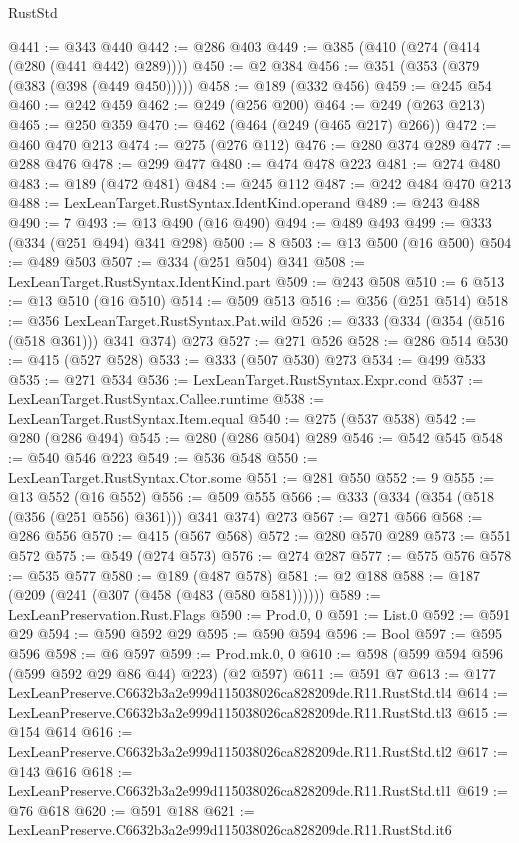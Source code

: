 \begin{lexlean}{RustStd}
\begin{coremodule}
@441 := @343 @440
@442 := @286 @403
@449 := @385 (@410 (@274 (@414 (@280 (@441 @442) @289))))
@450 := @2 @384
@456 := @351 (@353 (@379 (@383 (@398 (@449 @450)))))
@458 := @189 (@332 @456)
@459 := @245 @54
@460 := @242 @459
@462 := @249 (@256 @200)
@464 := @249 (@263 @213)
@465 := @250 @359
@470 := @462 (@464 (@249 (@465 @217) @266))
@472 := @460 @470 @213
@474 := @275 (@276 @112)
@476 := @280 @374 @289
@477 := @288 @476
@478 := @299 @477
@480 := @474 @478 @223
@481 := @274 @480
@483 := @189 (@472 @481)
@484 := @245 @112
@487 := @242 @484 @470 @213
@488 := LexLeanTarget.RustSyntax.IdentKind.operand
@489 := @243 @488
@490 := 7
@493 := @13 @490 (@16 @490)
@494 := @489 @493
@499 := @333 (@334 (@251 @494) @341 @298)
@500 := 8
@503 := @13 @500 (@16 @500)
@504 := @489 @503
@507 := @334 (@251 @504) @341
@508 := LexLeanTarget.RustSyntax.IdentKind.part
@509 := @243 @508
@510 := 6
@513 := @13 @510 (@16 @510)
@514 := @509 @513
@516 := @356 (@251 @514)
@518 := @356 LexLeanTarget.RustSyntax.Pat.wild
@526 := @333 (@334 (@354 (@516 (@518 @361))) @341 @374) @273
@527 := @271 @526
@528 := @286 @514
@530 := @415 (@527 @528)
@533 := @333 (@507 @530) @273
@534 := @499 @533
@535 := @271 @534
@536 := LexLeanTarget.RustSyntax.Expr.cond
@537 := LexLeanTarget.RustSyntax.Callee.runtime
@538 := LexLeanTarget.RustSyntax.Item.equal
@540 := @275 (@537 @538)
@542 := @280 (@286 @494)
@545 := @280 (@286 @504) @289
@546 := @542 @545
@548 := @540 @546 @223
@549 := @536 @548
@550 := LexLeanTarget.RustSyntax.Ctor.some
@551 := @281 @550
@552 := 9
@555 := @13 @552 (@16 @552)
@556 := @509 @555
@566 := @333 (@334 (@354 (@518 (@356 (@251 @556) @361))) @341 @374) @273
@567 := @271 @566
@568 := @286 @556
@570 := @415 (@567 @568)
@572 := @280 @570 @289
@573 := @551 @572
@575 := @549 (@274 @573)
@576 := @274 @287
@577 := @575 @576
@578 := @535 @577
@580 := @189 (@487 @578)
@581 := @2 @188
@588 := @187 (@209 (@241 (@307 (@458 (@483 (@580 @581))))))
@589 := LexLeanPreservation.Rust.Flags
@590 := Prod.{0, 0}
@591 := List.{0}
@592 := @591 @29
@594 := @590 @592 @29
@595 := @590 @594
@596 := Bool
@597 := @595 @596
@598 := @6 @597
@599 := Prod.mk.{0, 0}
@610 := @598 (@599 @594 @596 (@599 @592 @29 @86 @44) @223) (@2 @597)
@611 := @591 @7
@613 := @177 LexLeanPreserve.C6632b3a2e999d115038026ca828209de.R11.RustStd.tl4
@614 := LexLeanPreserve.C6632b3a2e999d115038026ca828209de.R11.RustStd.tl3
@615 := @154 @614
@616 := LexLeanPreserve.C6632b3a2e999d115038026ca828209de.R11.RustStd.tl2
@617 := @143 @616
@618 := LexLeanPreserve.C6632b3a2e999d115038026ca828209de.R11.RustStd.tl1
@619 := @76 @618
@620 := @591 @188
@621 := LexLeanPreserve.C6632b3a2e999d115038026ca828209de.R11.RustStd.it6

\end{coremodule}
\end{lexlean}
